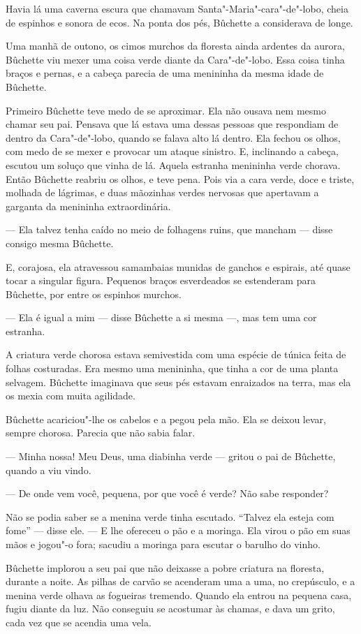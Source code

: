 Havia lá uma caverna escura que chamavam Santa"-Maria"-cara"-de"-lobo,
cheia de espinhos e sonora de ecos. Na ponta dos pés, Bûchette
a considerava de longe.

Uma manhã de outono, os cimos murchos da floresta ainda ardentes da
aurora, Bûchette viu mexer uma coisa verde diante da Cara"-de"-lobo. Essa
coisa tinha braços e pernas, e a cabeça parecia de uma menininha da mesma
idade de Bûchette.

Primeiro Bûchette teve medo de se aproximar. Ela não ousava nem
mesmo chamar seu pai. Pensava que lá estava uma dessas pessoas que
respondiam de dentro da Cara"-de"-lobo, quando se falava alto lá dentro. Ela
fechou os olhos, com medo de se mexer e provocar um ataque sinistro. E,
inclinando a cabeça, escutou um soluço que vinha de lá. Aquela estranha
menininha verde chorava. Então Bûchette reabriu os olhos, e teve pena.
Pois via a cara verde, doce e triste, molhada de lágrimas, e duas
mãozinhas verdes nervosas que apertavam a garganta da menininha
extraordinária.

--- Ela talvez tenha caído no meio de folhagens ruins, que mancham ---
disse consigo mesma Bûchette.

E, corajosa, ela atravessou samambaias munidas de ganchos e espirais,
até quase tocar a singular figura. Pequenos braços esverdeados se
estenderam para Bûchette, por entre os espinhos murchos.

--- Ela é igual a mim --- disse Bûchette a si mesma ---,  mas tem uma cor estranha.

A criatura verde chorosa estava semivestida com uma espécie de túnica
feita de folhas costuradas. Era mesmo uma menininha, que tinha a cor de
uma planta selvagem. Bûchette imaginava que seus pés estavam enraizados na
terra, mas ela os mexia com muita agilidade.

Bûchette acariciou"-lhe os cabelos e a pegou pela mão. Ela se deixou
levar, sempre chorosa. Parecia que não sabia falar.

--- Minha nossa! Meu Deus, uma diabinha verde --- gritou o pai de Bûchette,
quando a viu vindo.

--- De onde vem você, pequena, por que você é verde? Não sabe responder?

Não se podia saber se a menina verde tinha escutado. “Talvez ela esteja
com fome” --- disse ele. --- E lhe ofereceu o pão e a moringa. Ela virou o pão em
suas mãos e jogou"-o fora; sacudiu a moringa para escutar o barulho do
vinho.

Bûchette implorou a seu pai que não deixasse a pobre criatura na
floresta, durante a noite. As pilhas de carvão se acenderam uma a uma, no
crepúsculo, e a menina verde olhava as fogueiras tremendo. Quando ela
entrou na pequena casa, fugiu diante da luz. Não conseguiu se acostumar às
chamas, e dava um grito, cada vez que se acendia uma vela.


